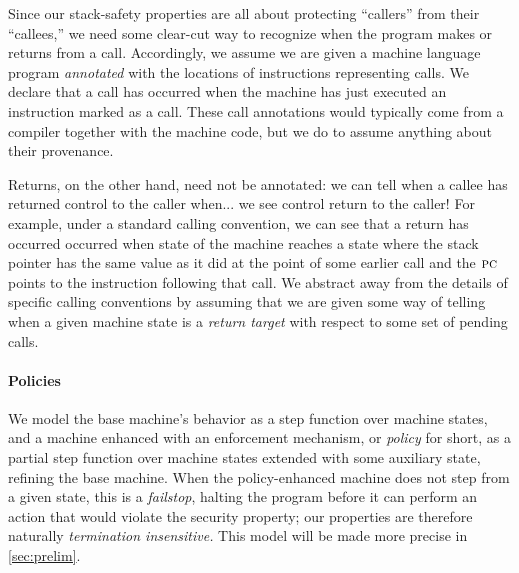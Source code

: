 \documentclass[acmsmall,review,anonymous]{acmart}\settopmatter{printfolios=true,printccs=false,printacmref=false}
\begin{document}
Since our stack-safety properties are all about protecting ``callers'' from
their ``callees,'' we need some clear-cut way to recognize when the program
makes or returns from a call.  Accordingly, we assume we are given a machine
language program {\em annotated} with the locations of instructions
representing calls.  We declare that a call has occurred when the machine
has just executed an instruction marked as a call.
%
These call annotations would typically come from a compiler together with
the machine code, but we do to assume anything about their provenance.

Returns, on the other hand, need not be annotated: we can tell when a callee
has returned control to the caller when... we see control return to the
caller!  For example, under a standard calling convention, we can see that a
return has occurred occurred when state of the machine reaches a state where
the stack pointer has the same value as it did at the point of some earlier
call and the $\textsc{pc}$ points to the instruction following that call.  We
abstract away from the details of specific calling conventions by assuming
that we are given some way of telling when a given machine state is a
{\em return target} with respect to some set of pending calls.


\paragraph*{Policies}
We model the base machine's behavior as a step function over machine states,
and a machine
enhanced with an enforcement mechanism, or {\em policy} for short, as a
partial step function over machine states extended with some
auxiliary state, refining the base machine. When the policy-enhanced machine
does not step from a given state, this is a {\em failstop}, halting the program before it can perform an
action that would violate the security property;
our properties are therefore naturally \emph{termination insensitive.}
This model will be made more precise in \cref{sec:prelim}.
\end{document}
